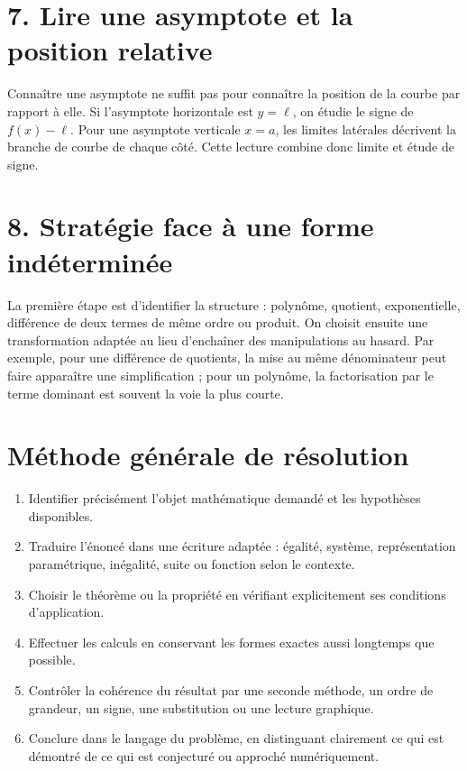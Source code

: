\section{7. Lire une asymptote et la position relative}
Connaître une asymptote ne suffit pas pour connaître la position de la courbe par rapport à elle. Si l'asymptote horizontale est $y=\ell$, on étudie le signe de $f(x)-\ell$. Pour une asymptote verticale $x=a$, les limites latérales décrivent la branche de courbe de chaque côté. Cette lecture combine donc limite et étude de signe.

\section{8. Stratégie face à une forme indéterminée}
La première étape est d'identifier la structure : polynôme, quotient, exponentielle, différence de deux termes de même ordre ou produit. On choisit ensuite une transformation adaptée au lieu d'enchaîner des manipulations au hasard. Par exemple, pour une différence de quotients, la mise au même dénominateur peut faire apparaître une simplification ; pour un polynôme, la factorisation par le terme dominant est souvent la voie la plus courte.


\section{Méthode générale de résolution}
\begin{methode}
\begin{enumerate}
\item Identifier précisément l'objet mathématique demandé et les hypothèses disponibles.
\item Traduire l'énoncé dans une écriture adaptée : égalité, système, représentation paramétrique, inégalité, suite ou fonction selon le contexte.
\item Choisir le théorème ou la propriété en vérifiant explicitement ses conditions d'application.
\item Effectuer les calculs en conservant les formes exactes aussi longtemps que possible.
\item Contrôler la cohérence du résultat par une seconde méthode, un ordre de grandeur, un signe, une substitution ou une lecture graphique.
\item Conclure dans le langage du problème, en distinguant clairement ce qui est démontré de ce qui est conjecturé ou approché numériquement.
\end{enumerate}
\end{methode}

